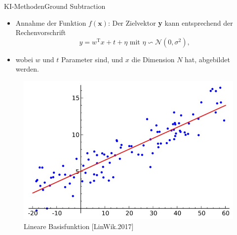 \documentclass[169, handout	]{THIbeamer} %
\begin{document}
\begin{frame}{KI-Methoden}{Ground Subtraction}
	\footnotesize		
	\begin{itemize}
		\item Annahme der Funktion $f(\textbf{x})$: Der Zielvektor \textbf{y} kann entsprechend der Rechenvorschrift
		\begin{equation}
			y = w^{\text{T}} x + t + \eta \text{ mit } \eta \backsim \mathcal{N}(0, \sigma^2) \text{,}
		\end{equation}
		\item[] wobei $w$ und $t$ Parameter sind, und $x$ die Dimension $N$ hat, abgebildet werden.		   
	\end{itemize}
	\begin{figure}
		\includegraphics[scale=0.25]{required/Lineare_Regression.jpg}
		\caption{\scriptsize Lineare Basisfunktion [LinWik.2017]}
		\label{Over and Underfitting}
	\end{figure}
\end{frame}
\end{document}
